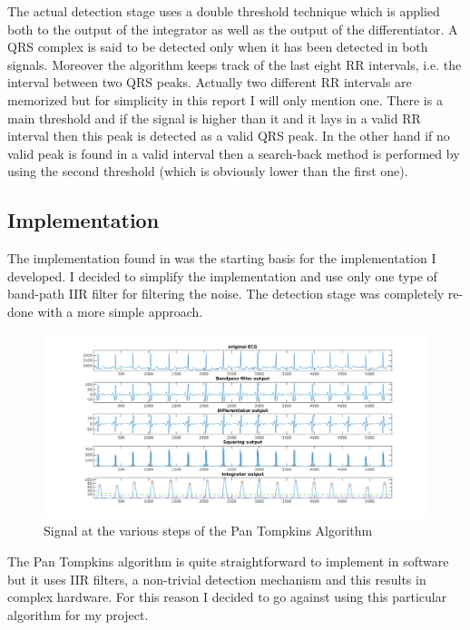 \documentclass{article}
\begin{document}
The actual detection stage uses a double threshold technique which is applied both to the output of the integrator as well as the output of the differentiator. A QRS complex is said to be detected only when it has been detected in both signals. Moreover the algorithm keeps track of the last eight RR intervals, i.e. the interval between two QRS peaks. Actually two different RR intervals are memorized but for simplicity in this report I will only mention one. There is a main threshold and if the signal is higher than it and it lays in a valid RR interval then this peak is detected as a valid QRS peak. In the other hand if no valid peak is found in a valid interval then a search-back method is performed by using the second threshold (which is obviously lower than the first one). 

\subsection{Implementation}

The implementation found in \cite{hooman} was the starting basis for the implementation I developed. I decided to simplify the implementation and use only one type of band-path IIR filter for filtering the noise. The detection stage was completely re-done with a more simple approach.

\begin{figure}%
        \centerline{\includegraphics[scale=0.6]{./figs/pantompkins.png}}
        \caption{Signal at the various steps of the Pan Tompkins Algorithm}
        \label{fig:pan}
\end{figure}

The Pan Tompkins algorithm is quite straightforward to implement in software but it uses IIR filters, a non-trivial detection mechanism and this results in complex hardware. For this reason I decided to go against using this particular algorithm for my project.
\end{document}
